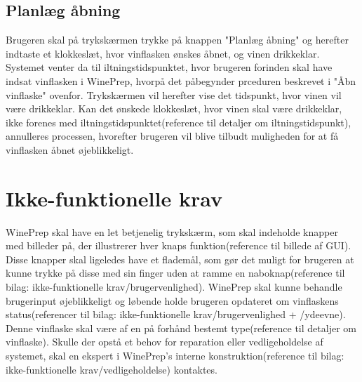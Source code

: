 \subsection{Planlæg åbning}
Brugeren skal på trykskærmen trykke på knappen "Planlæg åbning" og herefter indtaste et klokkeslæt, hvor vinflasken ønskes åbnet, og vinen drikkeklar. Systemet venter da til iltningstidspunktet, hvor brugeren forinden skal have indsat vinflasken i WinePrep, hvorpå det påbegynder prceduren beskrevet i "Åbn vinflaske" ovenfor. Trykskærmen vil herefter vise det tidspunkt, hvor vinen vil være drikkeklar. Kan det ønskede klokkeslæt, hvor vinen skal være drikkeklar, ikke forenes med iltningstidspunktet(reference til detaljer om iltningstidspunkt), annulleres processen, hvorefter brugeren vil blive tilbudt muligheden for at få vinflasken åbnet øjeblikkeligt.

\section{Ikke-funktionelle krav}
WinePrep skal have en let betjenelig trykskærm, som skal indeholde knapper med billeder på, der illustrerer hver knaps funktion(reference til billede af GUI). Disse knapper skal ligeledes have et flademål, som gør det muligt for brugeren at kunne trykke på disse med sin finger uden at ramme en naboknap(reference til bilag: ikke-funktionelle krav/brugervenlighed). WinePrep skal kunne behandle brugerinput øjeblikkeligt og løbende holde brugeren opdateret om vinflaskens status(referencer til bilag: ikke-funktionelle krav/brugervenlighed + /ydeevne). Denne vinflaske skal være af en på forhånd bestemt type(reference til detaljer om vinflaske). Skulle der opstå et behov for reparation eller vedligeholdelse af systemet, skal en ekspert i WinePrep's interne konstruktion(reference til bilag: ikke-funktionelle krav/vedligeholdelse) kontaktes.
